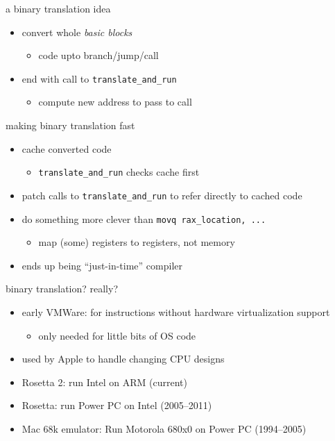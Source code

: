 \begin{frame}[fragile,label=binTransIdea2]{a binary translation idea}
    \begin{itemize}
    \item convert whole \textit{basic blocks}
        \begin{itemize}
        \item code upto branch/jump/call
        \end{itemize}
    \item end with call to {\tt translate\_and\_run}
        \begin{itemize}
        \item compute new  address to pass to call
        \end{itemize}
    \end{itemize}
\end{frame}

\begin{frame}[fragile,label=binTransIdea3]{making binary translation fast}
    \begin{itemize}
    \item cache converted code
        \begin{itemize}
        \item {\tt translate\_and\_run} checks cache first
        \end{itemize}
    \item patch calls to {\tt translate\_and\_run} to refer directly to cached code
    \item do something more clever than \lstinline|movq rax_location, ...|
        \begin{itemize}
        \item map (some) registers to registers, not memory
        \end{itemize}
    \item ends up being ``just-in-time'' compiler
    \end{itemize}
\end{frame}


\begin{frame}{binary translation? really?}
    \begin{itemize}
    \item early VMWare: for instructions without hardware virtualization support
        \begin{itemize}
        \item only needed for little bits of OS code
        \end{itemize}
    \item used by Apple to handle changing CPU designs
    \item Rosetta 2: run Intel on ARM (current)
    \item Rosetta: run Power PC on Intel (2005--2011)
    \item Mac 68k emulator: Run Motorola 680x0 on Power PC (1994--2005)
    \end{itemize}
\end{frame}

